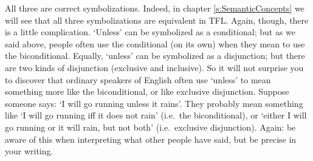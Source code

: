 All three are correct symbolizations. Indeed, in chapter \ref{s:SemanticConcepts} we will see that all three symbolizations are equivalent in TFL.
Again, though, there is a little complication. `Unless' can be symbolized as a conditional; but as we said above, people often use the conditional (on its own) when they mean to use the biconditional. Equally, `unless' can be symbolized as a disjunction; but there are two kinds of disjunction (exclusive and inclusive). So it will not surprise you to discover that ordinary speakers of English often use `unless' to mean something more like the biconditional, or like exclusive disjunction. Suppose someone says: `I will go running unless it rains'. They probably mean something like `I will go running iff it does not rain' (i.e.\ the biconditional), or  `either I will go running or it will rain, but not both' (i.e.\ exclusive disjunction). Again: be aware of this when interpreting what other people have said, but be precise in your writing.

